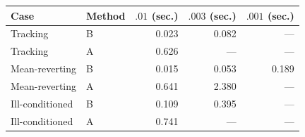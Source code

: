 \begin{tabular}{llrrr}
\toprule
Case & Method & $.01$ (sec.) & $.003$ (sec.) & $.001$ (sec.) \\
\midrule
Tracking & B & 0.023 & 0.082 & --- \\
Tracking & A & 0.626 & --- & --- \\
Mean-reverting & B & 0.015 & 0.053 & 0.189 \\
Mean-reverting & A & 0.641 & 2.380 & --- \\
Ill-conditioned & B & 0.109 & 0.395 & --- \\
Ill-conditioned & A & 0.741 & --- & --- \\
\bottomrule
\end{tabular}
